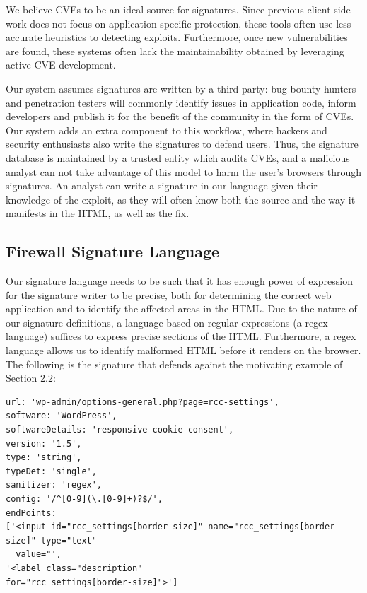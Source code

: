 We believe CVEs to be an ideal source for signatures. Since previous client-side work does not focus on application-specific protection, these tools often use less accurate heuristics to detecting exploits. Furthermore, once new vulnerabilities are found, these systems often lack the maintainability obtained by leveraging active CVE development. 

Our system assumes signatures are written by a third-party: bug bounty hunters and penetration testers will commonly identify issues in application code, inform developers and publish it for the benefit of the community in the form of CVEs. Our system adds an extra component to this workflow, where hackers and security enthusiasts also write the signatures to defend users. Thus, the signature database is maintained by a trusted entity which audits CVEs, and a malicious analyst can not take advantage of this model to harm the user's browsers through signatures. An analyst can write a signature in our language given their knowledge of the exploit, as they will often know both the source and the way it manifests in the HTML, as well as the fix.
 
 \subsection{Firewall Signature Language} \label{signature_language}
 Our signature language needs to be such that it has enough power of expression for the signature writer to be precise, both for determining the correct web application and to identify the affected areas in the HTML. Due to the nature of our signature definitions, a language based on regular expressions (a regex language) suffices to express precise sections of the HTML. Furthermore, a regex language allows us to identify malformed HTML before it renders on the browser. The following is the signature that defends against the motivating example of Section 2.2:
\begin{lstlisting}[breaklines=true,caption={An \sys signature},label={lst:xsnare_signature}]
url: 'wp-admin/options-general.php?page=rcc-settings',
software: 'WordPress',
softwareDetails: 'responsive-cookie-consent',
version: '1.5',
type: 'string',
typeDet: 'single',
sanitizer: 'regex',
config: '/^[0-9](\.[0-9]+)?$/',
endPoints: 
['<input id="rcc_settings[border-size]" name="rcc_settings[border-size]" type="text"
  value="',
'<label class="description" 
for="rcc_settings[border-size]">']
\end{lstlisting}

